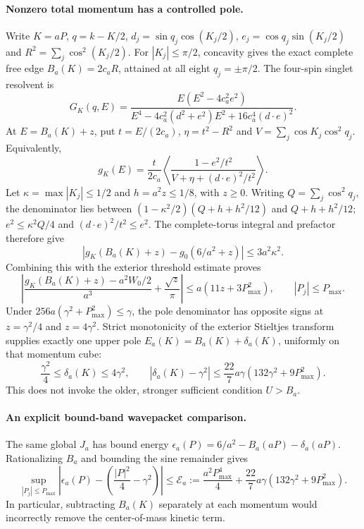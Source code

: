 \paragraph{Nonzero total momentum has a controlled pole.}
Write $K=aP$, $q=k-K/2$, $d_j=\sin q_j\cos(K_j/2)$,
$e_j=\cos q_j\sin(K_j/2)$ and $R^2=\sum_j\cos^2(K_j/2)$.
For $|K_j|\leq\pi/2$, concavity gives the exact complete free edge
$B_a(K)=2c_aR$, attained at all eight $q_j=\pm\pi/2$.
The four-spin singlet resolvent is
\[
 G_K(q,E)=
 \frac{E(E^2-4c_a^2e^2)}
 {E^4-4c_a^2(d^2+e^2)E^2+16c_a^4(d\cdot e)^2}.
\]
At $E=B_a(K)+z$, put $t=E/(2c_a)$,
$\eta=t^2-R^2$ and $V=\sum_j\cos K_j\cos^2q_j$.  Equivalently,
\[
 g_K(E)=\frac{t}{2c_a}
 \left\langle\frac{1-e^2/t^2}{V+\eta+(d\cdot e)^2/t^2}\right\rangle.
\]
Let $\kappa=\max|K_j|\leq1/2$ and $h=a^2z\leq1/8$, with $z\geq0$.
Writing $Q=\sum_j\cos^2q_j$, the denominator lies between
$(1-\kappa^2/2)(Q+h+h^2/12)$ and $Q+h+h^2/12$;
$e^2\leq\kappa^2Q/4$ and $(d\cdot e)^2/t^2\leq e^2$.
The complete-torus integral and prefactor therefore give
\[
 |g_K(B_a(K)+z)-g_0(6/a^2+z)|\leq3a^2\kappa^2.
\]
Combining this with the exterior threshold estimate proves
\[
 \left|\frac{g_K(B_a(K)+z)-a^2W_0/2}{a^3}
             +\frac{\sqrt z}{\pi}\right|
       \leq a(11z+3P_{\max}^2),\qquad |P_j|\leq P_{\max}.
\]
Under $256a(\gamma^2+P_{\max}^2)\leq\gamma$, the pole denominator
has opposite signs at $z=\gamma^2/4$ and $z=4\gamma^2$.
Strict monotonicity of the exterior Stieltjes transform supplies exactly
one upper pole $E_a(K)=B_a(K)+\delta_a(K)$, uniformly on that momentum cube:
\[
 \frac{\gamma^2}{4}\leq\delta_a(K)\leq4\gamma^2,
 \qquad
 |\delta_a(K)-\gamma^2|
       \leq\frac{22}{7}a\gamma(132\gamma^2+9P_{\max}^2).
\]
This does not invoke the older, stronger sufficient condition $U>B_a$.

\paragraph{An explicit bound-band wavepacket comparison.}
The same global $J_a$ has bound energy
$\epsilon_a(P)=6/a^2-B_a(aP)-\delta_a(aP)$.  Rationalizing $B_a$ and
bounding the sine remainder gives
\[
 \sup_{|P_j|\leq P_{\max}}
 \left|\epsilon_a(P)-\left(\frac{|P|^2}{4}-\gamma^2\right)\right|
 \leq\mathcal E_a
 :=\frac{a^2P_{\max}^4}{4}
   +\frac{22}{7}a\gamma(132\gamma^2+9P_{\max}^2).
\]
In particular, subtracting $B_a(K)$ separately at each momentum would
incorrectly remove the center-of-mass kinetic term.

